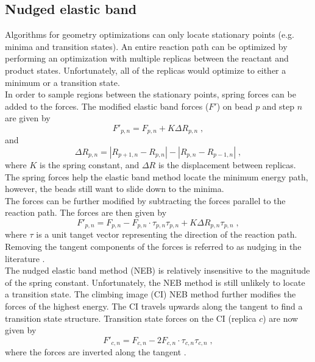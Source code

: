 \documentclass[12pt]{report}
\begin{document}
\subsection{Nudged elastic band}

Algorithms for geometry optimizations can only locate stationary points (e.g.
minima and transition states).
An entire reaction path can be optimized by performing an optimization with
multiple replicas between the reactant and product states.
Unfortunately, all of the replicas would optimize to either a minimum or
a transition state. \\

In order to sample regions between the stationary points, spring forces
can be added to the forces.
The modified elastic band forces ($F'$) on bead $p$ and step $n$ are given
by
\begin{equation}
 F'_{p,n} = F_{p,n}+K\Delta R_{p,n} \; ,
\end{equation}
and
\begin{equation}
 \Delta R_{p,n} = |R_{p+1,n}-R_{p,n}|-|R_{p,n}-R_{p-1,n}| \; ,
\end{equation}
where $K$ is the spring constant, and $\Delta R$ is the displacement between
replicas.
The spring forces help the elastic band method locate the minimum energy
path, however, the beads still want to slide down to the minima. \\

The forces can be further modified by subtracting the forces parallel to the
reaction path.
The forces are then given
by \cite{NEB2000_A,NEB2000_B}
\begin{equation}
 F'_{p,n} = F_{p,n}-F_{p,n}\cdot\tau_{p,n}\tau_{p,n}
            +K\Delta R_{p,n}\tau_{p,n} \; ,
\end{equation}
where $\tau$ is a unit tanget vector representing the direction of the
reaction path.
Removing the tangent components of the forces is referred to as nudging in
the literature \cite{NEB2000_A,NEB2000_B}. \\

The nudged elastic band method (NEB) is relatively insensitive to the
magnitude of the spring constant.
Unfortunately, the NEB method
is still unlikely to locate a transition state.
The climbing image (CI)
NEB method \cite{NEB2000_A}
further modifies the forces of the
highest energy.
The CI travels upwards along the tangent to find a transition
state structure.
Transition state forces on the CI (replica $c$) are now given by
\begin{equation}
 F'_{c,n} = F_{c,n}-2F_{c,n}\cdot\tau_{c,n}\tau_{c,n} \; ,
\end{equation}
where the forces are inverted along the
tangent \cite{NEB2000_A}. \\
\end{document}
